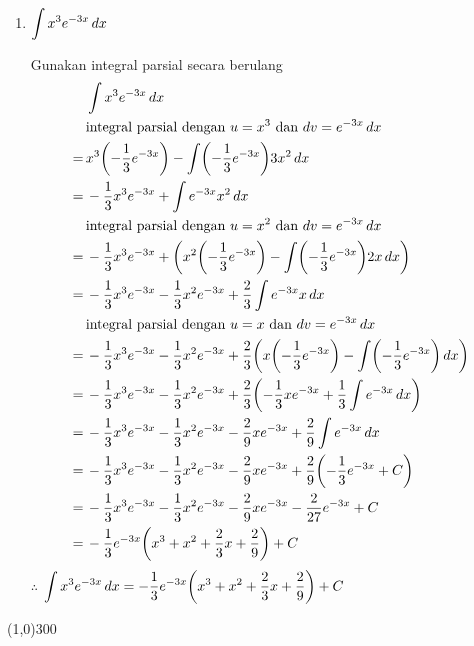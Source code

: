 \begin{enumerate}[leftmargin=*, label={\arabic*}.]
\begin{enumerate}[label={\alph*}.]
    \item $\displaystyle \int x^{3}e^{-3x}\,dx$
    
    Gunakan integral parsial secara berulang
    \begin{align*}
        &\int x^{3}e^{-3x}\,dx\\
        &\text{integral parsial dengan $u=x^{3}$ dan $dv=e^{-3x}\,dx$}\\
        =\,&x^{3}\brk*{-\frac{1}{3}e^{-3x}}-\int\brk*{-\frac{1}{3}e^{-3x}}3x^{2}\,dx\\
        =\,&-\frac{1}{3}x^{3}e^{-3x}+\int e^{-3x}x^{2}\,dx\\
        &\text{integral parsial dengan $u=x^{2}$ dan $dv=e^{-3x}\,dx$}\\
        =\,&-\frac{1}{3}x^{3}e^{-3x}+\brk*{x^{2}\brk*{-\frac{1}{3}e^{-3x}}
        -\int \brk*{-\frac{1}{3}e^{-3x}}2x\,dx}\\
        =\,&-\frac{1}{3}x^{3}e^{-3x}-\frac{1}{3}x^{2}e^{-3x}
        +\frac{2}{3}\int e^{-3x}x\,dx\\
        &\text{integral parsial dengan $u=x$ dan $dv=e^{-3x}\,dx$}\\
        =\,&-\frac{1}{3}x^{3}e^{-3x}-\frac{1}{3}x^{2}e^{-3x}
        +\frac{2}{3}\brk*{x\brk*{-\frac{1}{3}e^{-3x}}
        -\int\brk*{-\frac{1}{3}e^{-3x}}\,dx}\\
        =\,&-\frac{1}{3}x^{3}e^{-3x}-\frac{1}{3}x^{2}e^{-3x}
        +\frac{2}{3}\brk*{-\frac{1}{3}xe^{-3x}+\frac{1}{3}\int e^{-3x}\,dx}\\
        =\,&-\frac{1}{3}x^{3}e^{-3x}-\frac{1}{3}x^{2}e^{-3x}
        -\frac{2}{9}xe^{-3x}+\frac{2}{9}\int e^{-3x}\,dx\\
        =\,&-\frac{1}{3}x^{3}e^{-3x}-\frac{1}{3}x^{2}e^{-3x}
        -\frac{2}{9}xe^{-3x}+\frac{2}{9}\brk*{-\frac{1}{3} e^{-3x}+C}\\
        =\,&-\frac{1}{3}x^{3}e^{-3x}-\frac{1}{3}x^{2}e^{-3x}
        -\frac{2}{9}xe^{-3x}-\frac{2}{27} e^{-3x}+C\\
        =\,&-\frac{1}{3}e^{-3x}\brk*{x^{3}+x^{2}
        +\frac{2}{3}x+\frac{2}{9}}+C\\
    \end{align*}
    $\therefore$ $\ds \int x^{3}e^{-3x}\,dx 
    =-\frac{1}{3}e^{-3x}\brk*{x^{3}+x^{2}+\frac{2}{3}x+\frac{2}{9}}+C$
    \end{enumerate}
\end{enumerate}

\begin{center}\line(1,0){300}\end{center}
